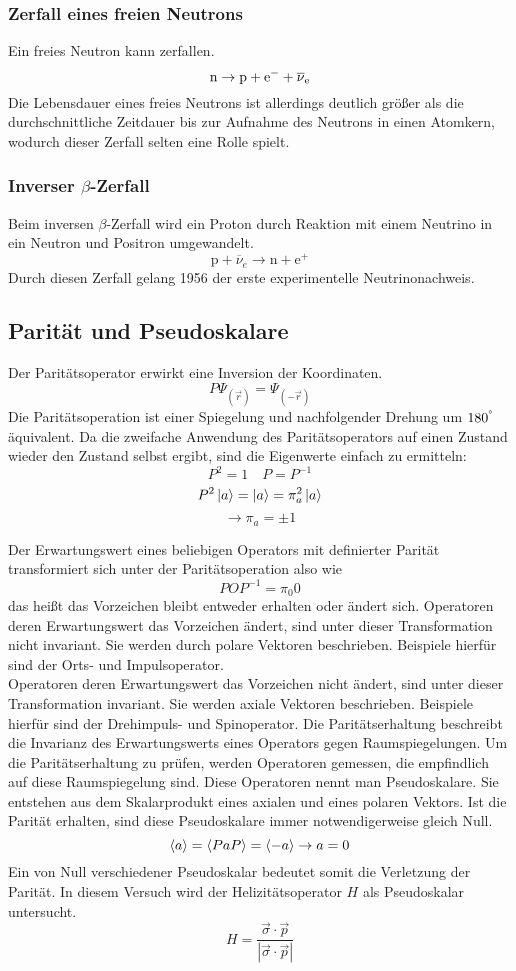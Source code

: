 \subsubsection{Zerfall eines freien Neutrons}
Ein freies Neutron kann zerfallen. 
$${\hbox{n}}\to {\hbox{p}}+{\hbox{e}}^{-}+\overline {\nu }_{{{\mathrm {e}}}}$$
Die Lebensdauer eines freies Neutrons ist allerdings deutlich größer als die durchschnittliche Zeitdauer bis zur Aufnahme des Neutrons in einen Atomkern, wodurch dieser Zerfall selten eine Rolle spielt.
\subsubsection{Inverser $\beta$-Zerfall}
Beim inversen $\beta$-Zerfall wird ein Proton durch Reaktion mit einem Neutrino in ein Neutron und Positron umgewandelt.
$${\displaystyle \mathrm {p} +{\overline {\nu }}_{e}\to \mathrm {n} +\mathrm {e} ^{+}}$$
Durch diesen Zerfall gelang 1956 der erste experimentelle Neutrinonachweis.

\subsection{Parität und Pseudoskalare}

Der Paritätsoperator erwirkt eine Inversion der Koordinaten. 
$$P\Psi_{(\vec{r})} = \Psi_{(-\vec{r})}$$
Die Paritätsoperation ist einer Spiegelung und nachfolgender Drehung um $180^\degree$ äquivalent.
Da die zweifache Anwendung des Paritätsoperators auf einen Zustand wieder den Zustand selbst ergibt, sind die Eigenwerte einfach zu ermitteln:
$$P^2 = 1 \quad P = P^{-1} $$
$$P^2\ket{a} = \ket{a} = \pi_a^2\ket{a}$$
$$\rightarrow \pi_a = \pm 1$$

Der Erwartungswert eines beliebigen Operators mit definierter Parität transformiert sich unter der Paritätsoperation also wie
$$POP^{-1} = \pi_0 0$$
das heißt das Vorzeichen bleibt entweder erhalten oder ändert sich. 
Operatoren deren Erwartungswert das Vorzeichen ändert, sind unter dieser Transformation nicht invariant. Sie werden durch polare Vektoren beschrieben. Beispiele hierfür sind der Orts- und Impulsoperator.\\
Operatoren deren Erwartungswert das Vorzeichen nicht ändert, sind unter dieser Transformation invariant. Sie werden axiale Vektoren beschrieben. Beispiele hierfür sind der Drehimpuls- und Spinoperator. 
Die Paritätserhaltung beschreibt die Invarianz des Erwartungswerts eines Operators gegen Raumspiegelungen. Um die Paritätserhaltung zu prüfen, werden Operatoren gemessen, die empfindlich auf diese Raumspiegelung sind. Diese Operatoren nennt man Pseudoskalare. Sie entstehen aus dem Skalarprodukt eines axialen und eines polaren Vektors. Ist die Parität erhalten, sind diese Pseudoskalare immer notwendigerweise gleich Null. 
$$\braket{a} = \braket{PaP} = \braket{-a} \rightarrow a = 0$$
Ein von Null verschiedener Pseudoskalar bedeutet somit die Verletzung der Parität.
In diesem Versuch wird der Helizitätsoperator $H$ als Pseudoskalar untersucht. 
$$ H = \frac{\vec{\sigma}\cdot\vec{p}}{\left\vert\vec{\sigma}\cdot\vec{p}\right\vert}$$


